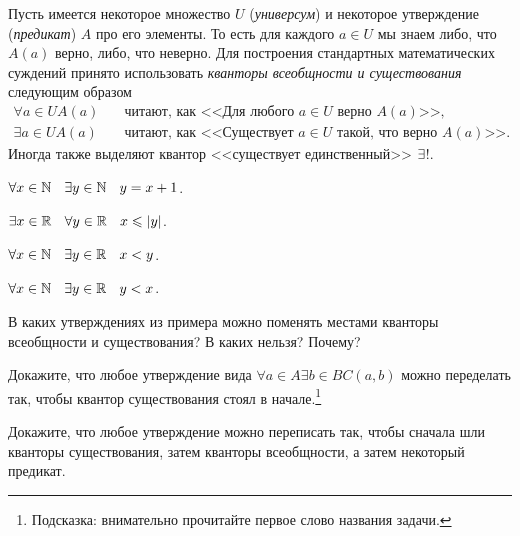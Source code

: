 \documentclass[a4paper, 12pt, num=24, date=06.11.2019]{listok}
\begin{document}
\begin{definition}
    Пусть имеется некоторое множество $U$ (\textit{универсум})
    и некоторое утверждение (\textit{предикат}) $A$ про его элементы.
    То есть для каждого $a \in U$ мы знаем либо, что $A(a)$ верно, либо, что неверно.
    Для построения стандартных математических суждений принято использовать \textit{кванторы всеобщности и существования} следующим образом
    \begin{align*}
        \forall{a \in U} A(a) &\quad\text{читают, как <<Для любого $a \in U$ верно $A(a)$>>},\\
        \exists{a \in U} A(a) &\quad\text{читают, как <<Существует $a \in U$ такой, что верно $A(a)$>>}.
    \end{align*}
    Иногда также выделяют квантор <<существует единственный>> $\existssym$!.
\end{definition}
\begin{example}
    \phantom{000}
    \begin{multienum}{2}
        \item $\forall{x \in \N} \exists{y \in \N} y = x + 1$.
        \item $\exists{x \in \R} \forall{y \in \R} x \le |y|$.
        \item $\forall{x \in \N} \exists{y \in \R} x < y$.
        \item $\forall{x \in \N} \exists{y \in \R} y < x$.
    \end{multienum}
\end{example}
\begin{problem}
\begin{probparts}
    \item В каких утверждениях из примера можно поменять местами кванторы всеобщности и существования? В каких нельзя? Почему?
    \item Докажите, что любое утверждение вида $\forall{a \in A} \exists{b \in B} C(a, b)$ можно переделать так, чтобы квантор существования стоял в начале.\footnote{%
        Подсказка: внимательно прочитайте первое слово названия задачи.}
    \item Докажите, что любое утверждение можно переписать так, чтобы сначала шли кванторы существования, затем кванторы всеобщности, а затем некоторый предикат.
\end{probparts}
\end{problem}
\end{document}
